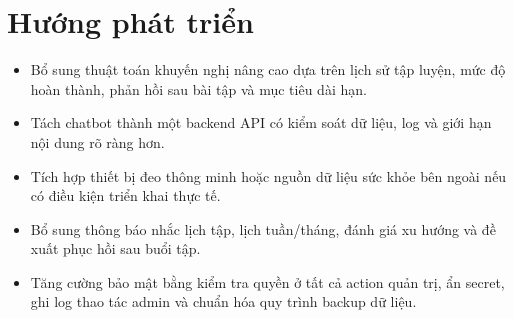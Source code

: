 \section*{Hướng phát triển}

\begin{itemize}

    \item Bổ sung thuật toán khuyến nghị nâng cao dựa trên lịch sử tập luyện, mức độ hoàn thành, phản hồi sau bài tập và mục tiêu dài hạn.

    \item Tách chatbot thành một backend API có kiểm soát dữ liệu, log và giới hạn nội dung rõ ràng hơn.

    \item Tích hợp thiết bị đeo thông minh hoặc nguồn dữ liệu sức khỏe bên ngoài nếu có điều kiện triển khai thực tế.

    \item Bổ sung thông báo nhắc lịch tập, lịch tuần/tháng, đánh giá xu hướng và đề xuất phục hồi sau buổi tập.

    \item Tăng cường bảo mật bằng kiểm tra quyền ở tất cả action quản trị, ẩn secret, ghi log thao tác admin và chuẩn hóa quy trình backup dữ liệu.

\end{itemize}
